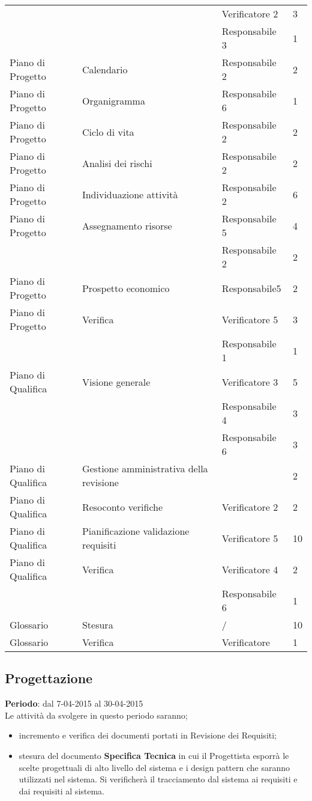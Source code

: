 {{\begin{longtable} [c]{| l | l | l | l |}
		&	&	Verificatore 2 & 3\\
		&	&	Responsabile 3 & 1\\
		Piano di Progetto & Calendario & Responsabile 2 & 2\\
		Piano di Progetto & Organigramma & Responsabile 6 & 1\\
		Piano di Progetto & Ciclo di vita & Responsabile 2 & 2\\
		Piano di Progetto & Analisi dei rischi & Responsabile 2 & 2\\
		Piano di Progetto & Individuazione attivit\`{a} & Responsabile 2 & 6\\
		Piano di Progetto & Assegnamento risorse & Responsabile 5 & 4\\
		&	&	Responsabile 2 & 2\\
		Piano di Progetto & Prospetto economico & Responsabile5 & 2\\
		Piano di Progetto & Verifica &  Verificatore 5 & 3\\
		&	&	Responsabile 1 & 1\\
		Piano di Qualifica & Visione generale & Verificatore 3 & 5\\
		&	&	Responsabile 4 & 3\\
		&	&	Responsabile 6 & 3\\
		Piano di Qualifica & Gestione amministrativa della revisione & & 2\\
		Piano di Qualifica & Resoconto verifiche & Verificatore 2 & 2\\
		Piano di Qualifica & Pianificazione validazione requisiti & Verificatore 5 & 10\\
		Piano di Qualifica & Verifica & Verificatore 4 & 2\\
		&	&	Responsabile 6 & 1\\
		Glossario & Stesura & / & 10\\
		Glossario & Verifica & Verificatore & 1\\
	\end{longtable}
}
\subsection{Progettazione}{
	\textbf{Periodo}: dal 7-04-2015 al 30-04-2015 \\
	
	Le attivit\`{a} da svolgere in questo periodo saranno;
	\begin{itemize}
		\item incremento e verifica dei documenti portati in Revisione dei Requisiti;
		\item stesura del documento \textbf{Specifica Tecnica} in cui il Progettista esporr\`{a} le scelte progettuali di alto livello del sistema e i design pattern che saranno utilizzati nel sistema. Si verificher\`{a} il tracciamento dal sistema ai requisiti e dai requisiti al sistema.
	\end{itemize}

}}
